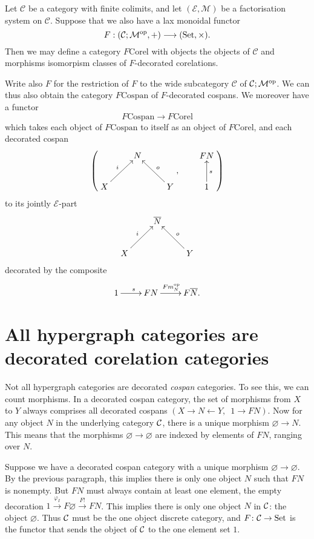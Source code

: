\begin{corollary}
  Let $\mathcal C$ be a category with finite colimits, and let $(\mathcal E,
  \mathcal M)$ be a factorisation system on $\mathcal C$. Suppose that we also
  have a lax monoidal functor
  \[
    F: (\mathcal C;\mathcal M^{\mathrm{op}},+) \longrightarrow (\mathrm{Set}, \times).
  \]
  Then we may define a category $F\mathrm{Corel}$ with objects the objects of
  $\mathcal C$ and morphisms isomorpism classes of $F$-decorated corelations.

  Write also $F$ for the restriction of $F$ to the wide subcategory $\mathcal
  C$ of $\mathcal C;\mathcal M^{\mathrm{op}}$. We can thus also obtain the category
  $F\mathrm{Cospan}$ of
  $F$-decorated cospans. We moreover have a functor 
  \[
    F\mathrm{Cospan} \to F\mathrm{Corel}
  \]
  which takes each object of $F\mathrm{Cospan}$ to itself as an object of
  $F\mathrm{Corel}$, and each decorated cospan
  \[
    \left(
    \begin{aligned}
      \xymatrix{
	& N \\  
	X \ar[ur]^{i} && Y \ar[ul]_{o}
      }
    \end{aligned}
    ,
    \qquad
    \begin{aligned}
      \xymatrix{
	FN \\
	1 \ar[u]_{s}
      }
    \end{aligned}
    \right)
  \]  
  to its jointly $\mathcal E$-part
  \[
    \xymatrix{
      & \overline{N} \\  
      X \ar[ur]^{i} && Y \ar[ul]_{o}
    }
  \]
  decorated by the composite
  \[
    \xymatrix{
      1 \ar[r]^s & FN \ar[r]^{Fm_N^\opp} & F\overline{N}.
    }
  \]
\end{corollary}


\section{All hypergraph categories are decorated corelation categories}

Not all hypergraph categories are decorated \emph{cospan} categories. To see
this, we can count morphisms. In a decorated cospan category, the set of
morphisms from $X$ to $Y$ always comprises all decorated cospans $(X \to N
\leftarrow Y,\enspace 1 \to FN)$. Now for any object $N$ in the underlying
category $\mathcal C$, there is a unique morphism $\varnothing \to N$. This means
that the morphisms $\varnothing \to \varnothing$ are indexed by elements of
$FN$, ranging over $N$.

Suppose we have a decorated cospan category with a unique morphism $\varnothing
\to \varnothing$. By the previous paragraph, this implies there is only one
object $N$ such that $FN$ is nonempty. But $FN$ must always contain at least one
element, the empty decoration $1 \xrightarrow{\varphi_I} F\varnothing
\xrightarrow{F!} FN$. This implies there is only one object $N$ in $\mathcal C$: the
object $\varnothing$. Thus $\mathcal C$ must be the one object discrete category, and
$F{\colon} \mathcal C \to \mathrm{Set}$ is the functor that sends the object of $\mathcal C$ to the
one element set $1$.


